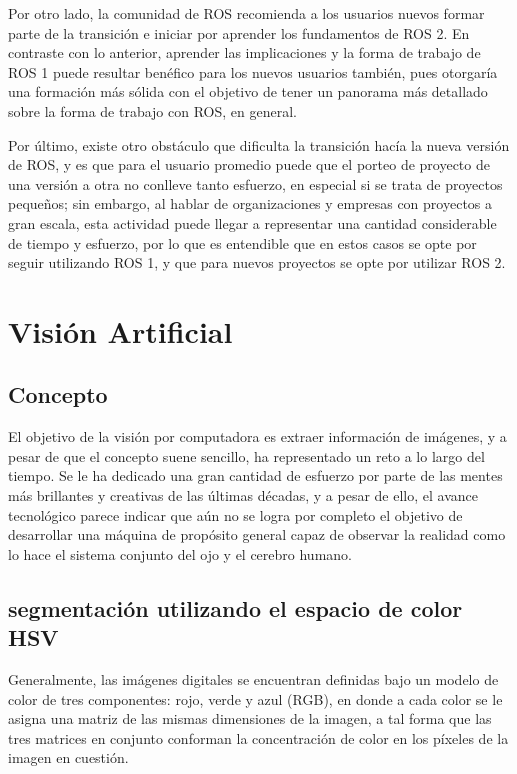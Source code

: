 Por otro lado, la comunidad de ROS recomienda a los usuarios nuevos formar parte de la transición e iniciar por aprender los fundamentos de ROS 2. En contraste con lo anterior, aprender las implicaciones y la forma de trabajo de ROS 1 puede resultar benéfico para los nuevos usuarios también, pues otorgaría una formación más sólida con el objetivo de tener un panorama más detallado sobre la forma de trabajo con ROS, en general.

Por último, existe otro obstáculo que dificulta la transición hacía la nueva versión de ROS, y es que para el usuario promedio puede que el porteo de proyecto de una versión a otra no conlleve tanto esfuerzo, en especial si se trata de proyectos pequeños; sin embargo, al hablar de organizaciones y empresas con proyectos a gran escala, esta actividad puede llegar a representar una cantidad considerable de tiempo y esfuerzo, por lo que es entendible que en estos casos se opte por seguir utilizando ROS 1, y que para nuevos proyectos se opte por utilizar ROS 2.

\section{Visión Artificial}

\subsection{Concepto}

El objetivo de la visión por computadora es extraer información de imágenes, y a pesar de que el concepto suene sencillo, ha representado un reto a lo largo del tiempo. Se le ha dedicado una gran cantidad de esfuerzo por parte de las mentes más brillantes y creativas de las últimas décadas, y a pesar de ello, el avance tecnológico parece indicar que aún no se logra por completo el objetivo de desarrollar una máquina de propósito general capaz de observar la realidad como lo hace el sistema conjunto del ojo y el cerebro humano.



\subsection{segmentación utilizando el espacio de color HSV}

Generalmente, las imágenes digitales se encuentran definidas bajo un modelo de color de tres componentes: rojo, verde y azul (RGB), en donde a cada color se le asigna una matriz de las mismas dimensiones de la imagen, a tal forma que las tres matrices en conjunto conforman la concentración de color en los píxeles de la imagen en cuestión.

